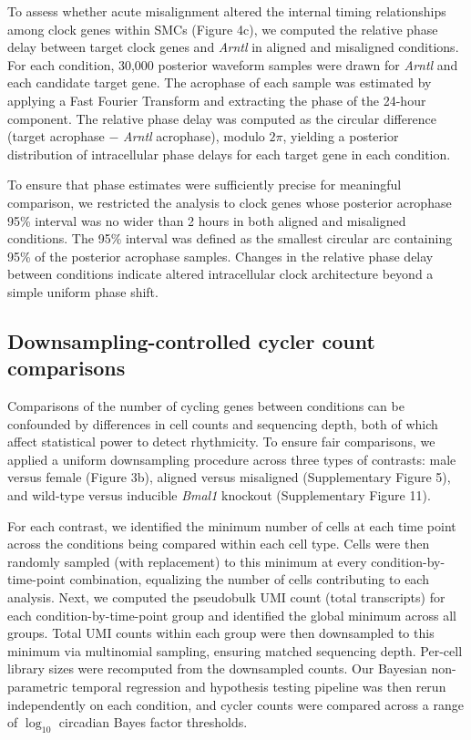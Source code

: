\documentclass[12pt]{article}
\begin{document}
To assess whether acute misalignment altered the internal timing relationships among clock genes
within SMCs (Figure 4c), we computed the relative phase delay between target clock genes and
\textit{Arntl} in aligned and misaligned conditions. For each condition, 30,000 posterior waveform
samples were drawn for \textit{Arntl} and each candidate target gene. The acrophase of each sample
was estimated by applying a Fast Fourier Transform and extracting the phase of the 24-hour
component. The relative phase delay was computed as the circular difference (target acrophase
$-$ \textit{Arntl} acrophase), modulo $2\pi$, yielding a posterior distribution of intracellular
phase delays for each target gene in each condition.

To ensure that phase estimates were sufficiently precise for meaningful comparison, we restricted the
analysis to clock genes whose posterior acrophase 95\% interval was no wider than 2 hours in both
aligned and misaligned conditions. The 95\% interval was defined as the smallest circular arc
containing 95\% of the posterior acrophase samples. Changes in the relative phase delay between
conditions indicate altered intracellular clock architecture beyond a simple uniform phase shift.

\subsection*{Downsampling-controlled cycler count comparisons}

Comparisons of the number of cycling genes between conditions can be confounded by differences in
cell counts and sequencing depth, both of which affect statistical power to detect rhythmicity. To
ensure fair comparisons, we applied a uniform downsampling procedure across three types of contrasts:
male versus female (Figure 3b), aligned versus misaligned (Supplementary Figure 5), and
wild-type versus inducible \textit{Bmal1} knockout (Supplementary Figure 11).

For each contrast, we identified the minimum number of cells at each time point across the conditions
being compared within each cell type. Cells were then randomly sampled (with replacement) to this
minimum at every condition-by-time-point combination, equalizing the number of cells contributing to
each analysis. Next, we computed the pseudobulk UMI count (total transcripts) for each
condition-by-time-point group and identified the global minimum across all groups. Total UMI counts
within each group were then downsampled to this minimum via multinomial sampling, ensuring matched
sequencing depth. Per-cell library sizes were recomputed from the downsampled counts. Our Bayesian
non-parametric temporal regression and hypothesis testing pipeline was then rerun independently on
each condition, and cycler counts were compared across a range of $\log_{10}$ circadian Bayes factor
thresholds.
\end{document}
